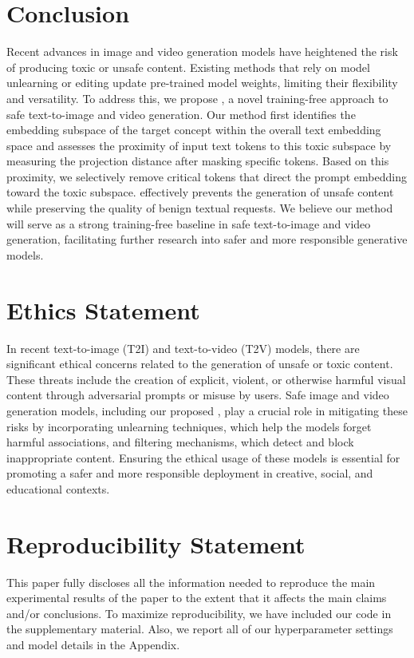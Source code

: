 \section{Conclusion}

Recent advances in image and video generation models have heightened the risk of producing toxic or unsafe content. Existing methods that rely on model unlearning or editing update pre-trained model weights, limiting their flexibility and versatility. To address this, we propose \ours{}, a novel training-free approach to safe text-to-image and video generation. Our method first identifies the embedding subspace of the target concept within the overall text embedding space and assesses the proximity of input text tokens to this toxic subspace by measuring the projection distance after masking specific tokens. Based on this proximity, we selectively remove critical tokens that direct the prompt embedding toward the toxic subspace. \ours{} effectively prevents the generation of unsafe content while preserving the quality of benign textual requests. We believe our method will serve as a strong training-free baseline in safe text-to-image and video generation, facilitating further research into safer and more responsible generative models.

\section*{Ethics Statement}
In recent text-to-image (T2I) and text-to-video (T2V) models, there are significant ethical concerns related to the generation of unsafe or toxic content. These threats include the creation of explicit, violent, or otherwise harmful visual content through adversarial prompts or misuse by users. Safe image and video generation models, including our proposed \ours{}, play a crucial role in mitigating these risks by incorporating unlearning techniques, which help the models forget harmful associations, and filtering mechanisms, which detect and block inappropriate content. Ensuring the ethical usage of these models is essential for promoting a safer and more responsible deployment in creative, social, and educational contexts.


\section*{Reproducibility Statement}
This paper fully discloses all the information needed to reproduce the main experimental results of the paper to the extent that it affects the main claims and/or conclusions. To maximize reproducibility, we have included our code in the supplementary material. Also, we report all of our hyperparameter settings and model details in the Appendix. 




